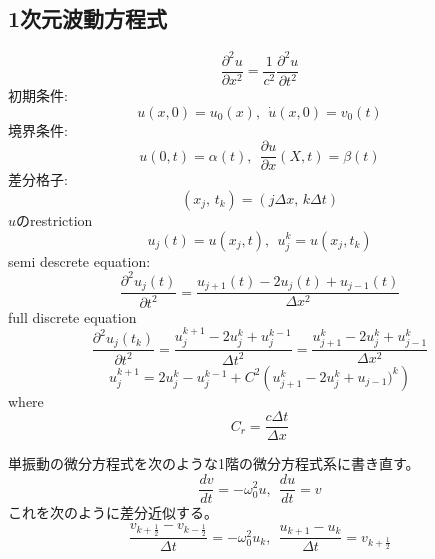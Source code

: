 \documentclass[10pt,a4j,dvipdfmx]{jarticle}
\begin{document}
\subsection{1次元波動方程式}
\begin{equation}
	\frac{\partial^2 u}{\partial x^2} =\frac{1}{c^2}\frac{\partial^2 u}{\partial t^2}
	\label{eqn:}
\end{equation}
初期条件:
\begin{equation}
	u(x,0)=u_0(x), \ \ \dot{u}(x,0)=v_0(t)
	\label{eqn:}
\end{equation}
境界条件:
\begin{equation}
	u(0,t)=\alpha(t), \ \ \frac{\partial u}{\partial x}(X,t)=\beta(t)
	\label{eqn:}
\end{equation}
差分格子:
\begin{equation}
	(x_j,\, t_k)=(j\Delta x,\, k\Delta t)
	\label{eqn:}
\end{equation}
$u$のrestriction
\begin{equation}
	u_j(t)=u(x_j,t), \ \ u^k_j=u(x_j,t_k)
	\label{eqn:}
\end{equation}
semi descrete equation:
\begin{equation}
	\frac{\partial^2 u_j(t)}{\partial t^2}
	=\frac{u_{j+1}(t)-2u_j(t)+u_{j-1}(t)}{\Delta x^2}
	\label{eqn:}
\end{equation}
full discrete equation
\begin{equation}
	\frac{\partial^2 u_j(t_k)}{\partial t^2}
	=\frac{u_{j}^{k+1}-2u^k_j+u^{k-1}_j}{\Delta t^2}
	=\frac{u_{j+1}^k-2u_j^k+u_{j-1}^k}{\Delta x^2}
	\label{eqn:}
\end{equation}
\begin{equation}
	u^{k+1}_j = 2u^k_j- u^{k-1}_j
	+C^2 \left( 
		u_{j+1}^k-2u_j^k +u_{j-1})^k
	\right) 
	\label{eqn:}
\end{equation}
where 
\begin{equation}
	C_r=\frac{c \Delta t}{\Delta x}
	\label{eqn:}
\end{equation}


単振動の微分方程式を次のような1階の微分方程式系に書き直す。
\begin{equation}
	\frac{dv}{dt} = -\omega_0^2  u, \ \ \frac{du}{dt}=v
	\label{eqn:}
\end{equation}
これを次のように差分近似する。
\begin{equation}
	\frac{v_{k+\frac{1}{2}}-v_{k-\frac{1}{2}}}{\Delta t}=-\omega_0^2 u_{k}, \ \ 
	\frac{u_{k+1}-u_k}{\Delta t}=v_{k+\frac{1}{2}}
	\label{eqn:}
\end{equation}
\end{document}
